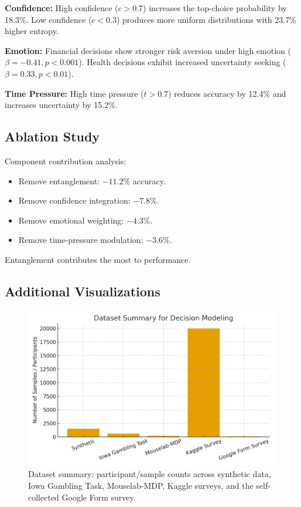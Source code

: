 \documentclass[conference]{IEEEtran}
\begin{document}
\textbf{Confidence:} High confidence ($c > 0.7$) increases the top-choice probability by 18.3\%. Low confidence ($c < 0.3$) produces more uniform distributions with 23.7\% higher entropy.

\textbf{Emotion:} Financial decisions show stronger risk aversion under high emotion ($\beta = -0.41, p < 0.001$). Health decisions exhibit increased uncertainty seeking ($\beta = 0.33, p < 0.01$).

\textbf{Time Pressure:} High time pressure ($t > 0.7$) reduces accuracy by 12.4\% and increases uncertainty by 15.2\%.

\subsection{Ablation Study}

Component contribution analysis:
\begin{itemize}
\item Remove entanglement: $-11.2$\% accuracy.
\item Remove confidence integration: $-7.8$\%.
\item Remove emotional weighting: $-4.3$\%.
\item Remove time-pressure modulation: $-3.6$\%.
\end{itemize}
Entanglement contributes the most to performance.

\subsection{Additional Visualizations}

\begin{figure}[t]
\centering
\includegraphics[width=\columnwidth]{dataset_summary.png}
\caption{Dataset summary: participant/sample counts across synthetic data, Iowa Gambling Task, Mouselab-MDP, Kaggle surveys, and the self-collected Google Form survey.}
\label{fig:dataset_summary}
\end{figure}
\end{document}
